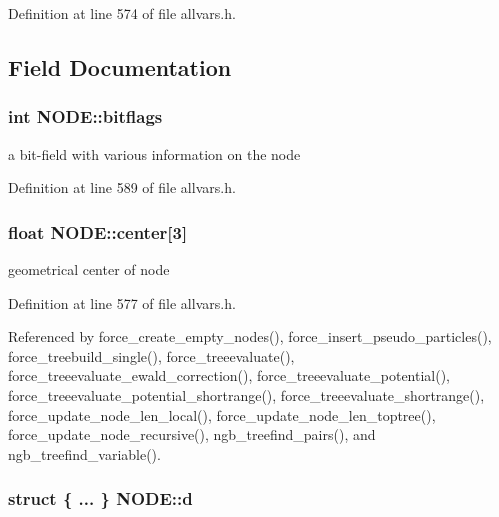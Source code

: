 Definition at line 574 of file allvars.h.



\subsection{Field Documentation}
\hypertarget{structNODE_a3678932e5e5b2947409657de4b70e8fc}{
\subsubsection[{bitflags}]{\setlength{\rightskip}{0pt plus 5cm}int {\bf NODE::bitflags}}}
\label{structNODE_a3678932e5e5b2947409657de4b70e8fc}
a bit-\/field with various information on the node 

Definition at line 589 of file allvars.h.

\hypertarget{structNODE_a27584ddd52a800cbf36c4de8e3fb4bc9}{
\subsubsection[{center}]{\setlength{\rightskip}{0pt plus 5cm}float {\bf NODE::center}\mbox{[}3\mbox{]}}}
\label{structNODE_a27584ddd52a800cbf36c4de8e3fb4bc9}
geometrical center of node 

Definition at line 577 of file allvars.h.



Referenced by force\_\-create\_\-empty\_\-nodes(), force\_\-insert\_\-pseudo\_\-particles(), force\_\-treebuild\_\-single(), force\_\-treeevaluate(), force\_\-treeevaluate\_\-ewald\_\-correction(), force\_\-treeevaluate\_\-potential(), force\_\-treeevaluate\_\-potential\_\-shortrange(), force\_\-treeevaluate\_\-shortrange(), force\_\-update\_\-node\_\-len\_\-local(), force\_\-update\_\-node\_\-len\_\-toptree(), force\_\-update\_\-node\_\-recursive(), ngb\_\-treefind\_\-pairs(), and ngb\_\-treefind\_\-variable().

\hypertarget{structNODE_a5ab829c8c9c85992ba220635f776de74}{
\subsubsection[{d}]{\setlength{\rightskip}{0pt plus 5cm}struct \{ ... \} 
     {\bf NODE::d}}}
\label{structNODE_a5ab829c8c9c85992ba220635f776de74}


